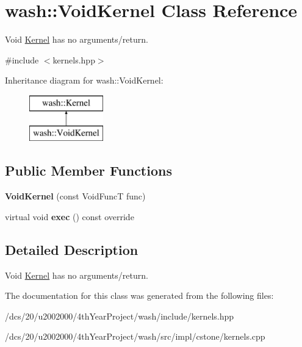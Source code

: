 \hypertarget{classwash_1_1VoidKernel}{}\section{wash\+:\+:Void\+Kernel Class Reference}
\label{classwash_1_1VoidKernel}


Void \mbox{\hyperlink{classwash_1_1Kernel}{Kernel}} has no arguments/return.  




{\ttfamily \#include $<$kernels.\+hpp$>$}

Inheritance diagram for wash\+:\+:Void\+Kernel\+:\begin{figure}[H]
\begin{center}
\leavevmode
\includegraphics[height=2.000000cm]{classwash_1_1VoidKernel}
\end{center}
\end{figure}
\subsection*{Public Member Functions}
\begin{DoxyCompactItemize}
\item 
\mbox{\label{classwash_1_1VoidKernel_abe7159c42c48bf15cf3d69dbf09388dc}} 
{\bfseries Void\+Kernel} (const Void\+FuncT func)
\item 
\mbox{\label{classwash_1_1VoidKernel_a2a271788509bac47a96dbbecd7fbe90e}} 
virtual void {\bfseries exec} () const override
\end{DoxyCompactItemize}


\subsection{Detailed Description}
Void \mbox{\hyperlink{classwash_1_1Kernel}{Kernel}} has no arguments/return. 

The documentation for this class was generated from the following files\+:\begin{DoxyCompactItemize}
\item 
/dcs/20/u2002000/4th\+Year\+Project/wash/include/kernels.\+hpp\item 
/dcs/20/u2002000/4th\+Year\+Project/wash/src/impl/cstone/kernels.\+cpp\end{DoxyCompactItemize}
